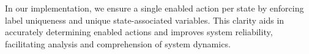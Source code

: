 In our implementation, we ensure a single enabled action per state by enforcing label uniqueness and unique state-associated variables. This clarity aids in accurately determining enabled actions and improves system reliability, facilitating analysis and comprehension of system dynamics.



